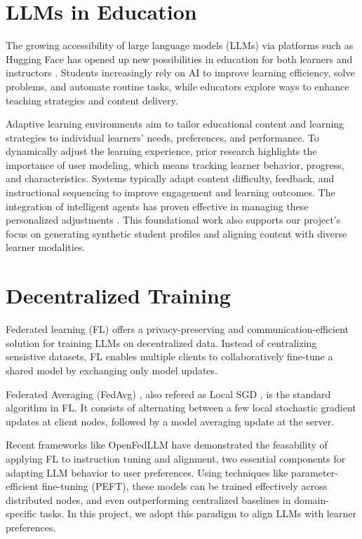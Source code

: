 \section{LLMs in Education} 
The growing accessibility of large language models (LLMs) via platforms such as Hugging Face has opened up new possibilities in education for both learners and instructors \cite{wang2024large}. Students increasingly rely on AI to improve learning efficiency, solve problems, and automate routine tasks, while educators explore ways to enhance teaching strategies and content delivery.

Adaptive learning environments aim to tailor educational content and learning strategies to individual learners' needs, preferences, and performance. To dynamically adjust the learning experience, prior research highlights the importance of user modeling, which means tracking learner behavior, progress, and characteristics. Systems typically adapt content difficulty, feedback, and instructional sequencing to improve engagement and learning outcomes. The integration of intelligent agents has proven effective in managing these personalized adjustments \cite{shih2008adaptive}. This foundational work also supports our project's focus on generating synthetic student profiles and aligning content with diverse learner modalities.

\section{Decentralized Training}
Federated learning (FL) \cite{mcmahan2023communicationefficientlearningdeepnetworks} offers a privacy-preserving and communication-efficient solution for training LLMs on decentralized data. Instead of centralizing sensistive datasets, FL enables multiple clients to collaboratively fine-tune a shared model by exchanging only model updates. 

Federated Averaging (FedAvg) \cite{mcmahan2023communicationefficientlearningdeepnetworks}, also refered as Local SGD \cite{stich2019localsgdconvergesfast}, is the standard algorithm in FL. It consists of alternating between a few local
stochastic gradient updates at client nodes, followed by a model averaging update at the server.

Recent frameworks like OpenFedLLM \cite{ye2024openfedllmtraininglargelanguage} have demonstrated the feasability of applying FL to instruction tuning and alignment, two essential components for adapting LLM behavior to user preferences. Using techniques like parameter-efficient fine-tuning (PEFT), these models can be trained effectively across distributed nodes, and even outperforming centralized baselines in domain-specific tasks. In this project, we adopt this paradigm to align LLMs with learner preferences.

